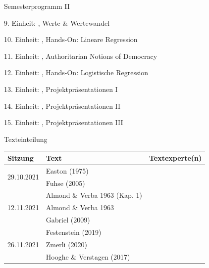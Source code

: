 \documentclass[11pt]{beamer}
\begin{document}
\begin{frame}[t]{Semesterprogramm II}
	\begin{nolist}
		\item[9.] Einheit: , Werte \& Wertewandel		
		\item[10.] Einheit: , Hands-On: Lineare Regression \pause
		\item[11.] Einheit: , Authoritarian Notions of Democracy
		\item[12.] Einheit: , Hands-On: Logistische Regression \pause
		\item[13.] Einheit: , Projektpräsentationen I
		\item[14.] Einheit: , Projektpräsentationen II 
		\item[15.] Einheit: , Projektpräsentationen III
	\end{nolist}
\end{frame}

\begin{frame}[t]{Texteinteilung}
	\begin{center}	
		\begin{table}
			\begin{tabular}{l l l}
			\toprule[2pt]
			Sitzung & Text & Textexperte(n)\\
			\midrule
			\multirow{2}{*}{29.10.2021} & Easton (1975) & \\
			\cmidrule{2-3}
			& Fuhse (2005) & \\
			\midrule
			\multirow{3}{*}{12.11.2021} & Almond \& Verba 1963 (Kap. 1) & \\
			\cmidrule{2-3}
			& Almond \& Verba 1963 & \\
			\cmidrule{2-3}
			& Gabriel (2009) & \\
			\midrule
			\multirow{4}{*}{26.11.2021} & Festenstein (2019) & \\
			\cmidrule{2-3}
			& Zmerli (2020) & \\
			\cmidrule{2-3}
			& Hooghe \& Verstagen (2017) & \\
			\bottomrule[2pt]
			\end{tabular}
		\end{table}
	\end{center}
\end{frame}
\end{document}
